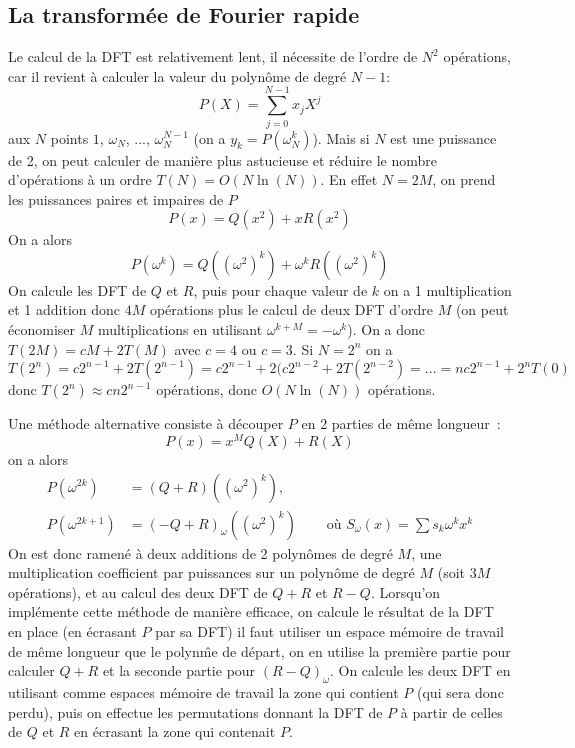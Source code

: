 \documentclass[a4paper,11pt]{article}
\begin{document}
\begin{giacjshere}
\subsection{La transformée de Fourier rapide}
Le calcul de la DFT est relativement lent, il nécessite de l'ordre
de $N^2$ opérations, car il revient à calculer la valeur du polynôme
de degré $N-1$:
\[ P(X)=\sum_{j=0}^{N-1} x_j X^j \]
aux $N$ points $1$, $\omega_N$, ..., $\omega_N^{N-1}$ 
(on a $y_k=P(\omega_N^k)$).
Mais si $N$ est une puissance de 2, on peut calculer de manière plus
astucieuse et réduire le nombre d'opérations à un ordre $T(N)=O(N \ln(N))$.
En effet $N=2M$,
on prend les
puissances paires et impaires de $P$
$$ P(x)=Q(x^2)+xR(x^2)$$
On a alors
$$ P(\omega^k)=Q( (\omega^2)^k)+\omega^k R((\omega^2)^k)$$
On calcule les DFT de $Q$ et $R$, puis pour chaque valeur de $k$ on a
1 multiplication et 1 addition donc $4M$ op\'erations plus le calcul
de deux DFT d'ordre $M$ (on peut \'economiser $M$ multiplications
en utilisant $\omega^{k+M} =-\omega^k$). On a donc $T(2M)=cM+2T(M)$
avec $c=4$ ou $c=3$. Si $N=2^n$ on a 
$$T(2^n)=c2^{n-1}+2T(2^{n-1})
= c2^{n-1}+2(c2^{n-2}+2T(2^{n-2})
=...=nc2^{n-1}+2^nT(0)$$
donc $T(2^n) \approx cn2^{n-1}$ op\'erations, donc $O(N\ln(N))$
opérations.

Une m\'ethode alternative consiste \`a 
d\'ecouper $P$ en 2 parties de m\^eme longueur~:
\[ P(x)=x^M Q(X) + R(X) \]
on a alors
\begin{eqnarray*}
P(\omega^{2k}) &= (Q+R) ((\omega^2)^{k}), \\
P(\omega^{2k+1}) &= (-Q +R)_\omega ((\omega^2)^k) \quad
&\mbox{ o\`u }  S_\omega(x)=\sum s_k \omega^k x^k
\end{eqnarray*}
On est donc ramen\'e \`a deux additions de 2 polyn\^omes de degr\'e $M$,
une multiplication coefficient par puissances sur un polyn\^ome de
degr\'e $M$ (soit $3M$ op\'erations),
et au calcul des deux DFT de $Q+R$ et $R-Q$. 
Lorsqu'on impl\'emente cette m\'ethode de mani\`ere efficace, 
on calcule le r\'esultat de la DFT en place (en \'ecrasant $P$ par sa DFT)
il faut utiliser un espace m\'emoire
de travail de m\^eme longueur que le polyn\^me de d\'epart, on en
utilise la premi\`ere partie pour calculer $Q+R$ et la seconde partie
pour $(R-Q)_\omega$. On calcule les deux DFT en utilisant comme
espaces m\'emoire de travail la zone qui contient $P$ (qui sera donc
perdu), puis on effectue les permutations donnant la DFT de $P$
\`a partir de celles de $Q$ et $R$ en \'ecrasant la zone qui contenait $P$.


\end{giacjshere}
\end{document}

